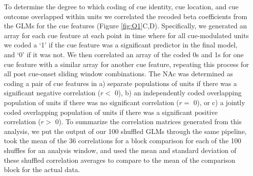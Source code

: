 \documentclass[11pt]{article}
\begin{document}
To determine the degree to which coding of cue identity, cue location, and cue outcome overlapped within units we correlated the recoded beta coefficients from the GLMs for the cue features (Figure \ref{fig:Q1}C,D). Specifically, we generated an array for each cue feature at each point in time where for all cue-modulated units we coded a `1' if the cue feature was a significant predictor in the final model, and `0' if it was not. We then correlated an array of the coded 0s and 1s for one cue feature with a similar array for another cue feature, repeating this process for all post cue-onset sliding window combinations. The NAc was determined as coding a pair of cue features in a) separate populations of units if there was a significant negative correlation ($r < $ 0), b) an independently coded overlapping population of units if there was no significant correlation ($r = $ 0), or c) a jointly coded overlapping population of units if there was a significant positive correlation ($r > $ 0). To summarize the correlation matrices generated from this analysis, we put the output of our 100 shuffled GLMs through the same pipeline, took the mean of the 36 correlations for a block comparison for each of the 100 shuffles for an analysis window, and used the mean and standard deviation of these shuffled correlation averages to compare to the mean of the comparison block for the actual data.
\end{document}
